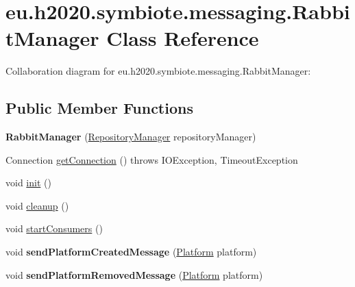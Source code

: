 \hypertarget{classeu_1_1h2020_1_1symbiote_1_1messaging_1_1RabbitManager}{}\section{eu.\+h2020.\+symbiote.\+messaging.\+Rabbit\+Manager Class Reference}
\label{classeu_1_1h2020_1_1symbiote_1_1messaging_1_1RabbitManager}


Collaboration diagram for eu.\+h2020.\+symbiote.\+messaging.\+Rabbit\+Manager\+:
\subsection*{Public Member Functions}
\begin{DoxyCompactItemize}
\item 
{\bfseries Rabbit\+Manager} (\hyperlink{classeu_1_1h2020_1_1symbiote_1_1repository_1_1RepositoryManager}{Repository\+Manager} repository\+Manager)\hypertarget{classeu_1_1h2020_1_1symbiote_1_1messaging_1_1RabbitManager_ad05170cea6626e742a9b3ff5a359b192}{}\label{classeu_1_1h2020_1_1symbiote_1_1messaging_1_1RabbitManager_ad05170cea6626e742a9b3ff5a359b192}

\item 
Connection \hyperlink{classeu_1_1h2020_1_1symbiote_1_1messaging_1_1RabbitManager_ac6037e07ab7703c98c8a880a1ea5f5cd}{get\+Connection} ()  throws I\+O\+Exception, Timeout\+Exception 
\item 
void \hyperlink{classeu_1_1h2020_1_1symbiote_1_1messaging_1_1RabbitManager_ae6688b10d5858345271d21eda576036c}{init} ()
\item 
void \hyperlink{classeu_1_1h2020_1_1symbiote_1_1messaging_1_1RabbitManager_abf294e221b0bbfc0faa81d38fcec50cd}{cleanup} ()
\item 
void \hyperlink{classeu_1_1h2020_1_1symbiote_1_1messaging_1_1RabbitManager_ab6555364fdd7e95b41802ae24da7f30f}{start\+Consumers} ()
\item 
void {\bfseries send\+Platform\+Created\+Message} (\hyperlink{classeu_1_1h2020_1_1symbiote_1_1model_1_1Platform}{Platform} platform)\hypertarget{classeu_1_1h2020_1_1symbiote_1_1messaging_1_1RabbitManager_ad0733a08e8a207dac36c8ae6a86dfe7e}{}\label{classeu_1_1h2020_1_1symbiote_1_1messaging_1_1RabbitManager_ad0733a08e8a207dac36c8ae6a86dfe7e}

\item 
void {\bfseries send\+Platform\+Removed\+Message} (\hyperlink{classeu_1_1h2020_1_1symbiote_1_1model_1_1Platform}{Platform} platform)\hypertarget{classeu_1_1h2020_1_1symbiote_1_1messaging_1_1RabbitManager_af0a5271ea2607bc84b77f81d70e6dcd7}{}\label{classeu_1_1h2020_1_1symbiote_1_1messaging_1_1RabbitManager_af0a5271ea2607bc84b77f81d70e6dcd7}


\end{DoxyCompactItemize}
